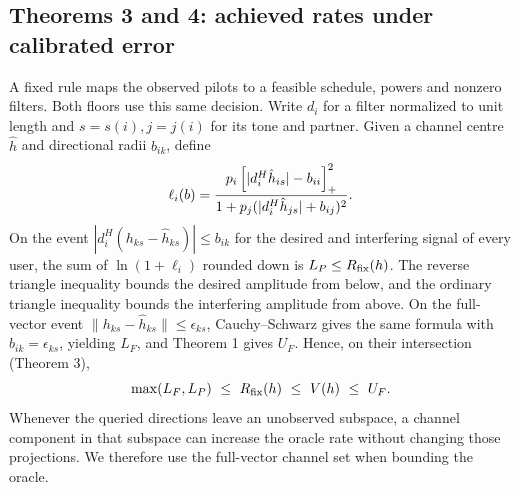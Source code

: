 \subsection*{Theorems 3 and 4: achieved rates under calibrated error}
A fixed rule maps the observed pilots to a feasible schedule, powers and nonzero filters. Both floors use this same decision. Write \(d_i\) for a filter normalized to unit length and \(s=s(i),j=j(i)\) for its tone and partner. Given a channel centre \(\hat h\) and directional radii \(b_{ik}\), define
\[
 \ell_i(b)=\frac{p_i\left[|d_i^H\hat h_{is}|-b_{ii}\right]_{+}^2}
                 {1+p_j(|d_i^H\hat h_{js}|+b_{ij})^2}.
\]
On the event \(|d_i^H(h_{ks}-\hat h_{ks})|\leq b_{ik}\) for the desired and interfering signal of every user, the sum of \(\ln(1+\ell_i)\) rounded down is \(L_P\leq R_{\mathrm{fix}}(h)\). The reverse triangle inequality bounds the desired amplitude from below, and the ordinary triangle inequality bounds the interfering amplitude from above. On the full-vector event \(\|h_{ks}-\hat h_{ks}\|\leq\epsilon_{ks}\), Cauchy--Schwarz gives the same formula with \(b_{ik}=\epsilon_{ks}\), yielding \(L_F\), and Theorem 1 gives \(U_F\). Hence, on their intersection (Theorem 3),
\[
       \max(L_F,L_P)\ \leq\ \fix(h)\ \leq\ V(h)\ \leq\ U_F .
\]
Whenever the queried directions leave an unobserved subspace, a channel component in that subspace can increase the oracle rate without changing those projections. We therefore use the full-vector channel set when bounding the oracle.


